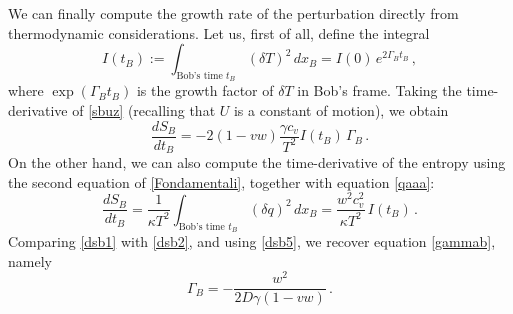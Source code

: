 \documentclass[a4paper, amsfonts, amssymb, amsmath, reprint, showkeys,  twoside, onecolumn,notitlepage,nofootinbib]{revtex4-1}
\theoremstyle{definition}
\theoremstyle{theorem}
\begin{document}
We can finally compute the growth rate of the perturbation directly from thermodynamic considerations. Let us, first of all, define the integral
\begin{equation}
I(t_B) := \int_{\text{Bob's time }t_B}  \! \! \! \!\! \! \! \! \! \! \! \! \!\! \! \! \! \! \! \! \! \!\!  (\delta T)^2 \, dx_B = I(0) \, e^{2\Gamma_B t_B} \, ,
\end{equation}
where $\exp(\Gamma_B t_B)$ is the growth factor of $\delta T$ in Bob's frame. Taking the time-derivative of \eqref{sbuz} (recalling that $U$ is a constant of motion), we obtain
\begin{equation}\label{dsb1}
\dfrac{dS_B}{dt_B} =  - 2(1-vw)\dfrac{\gamma c_v}{T^2} I(t_B) \,  \Gamma_B \, .
\end{equation}
On the other hand, we can also compute the time-derivative of the entropy using the second equation of \eqref{Fondamentali}, together with equation \eqref{qaaa}: 
\begin{equation}\label{dsb2}
\dfrac{dS_B}{dt_B} = \dfrac{1}{\kappa T^2} \int_{\text{Bob's time }t_B}  \! \! \! \!\! \! \! \! \! \! \! \! \!\! \! \! \! \! \! \! \! \!\!  (\delta q)^2 \, dx_B = \dfrac{w^2 c_v^2 }{\kappa T^2} \,  I(t_B) \, .
\end{equation}
Comparing \eqref{dsb1} with \eqref{dsb2}, and using \eqref{dsb5}, we recover equation \eqref{gammab}, namely
\begin{equation}
\Gamma_B = -\dfrac{w^2}{2D\gamma (1-vw)} \, .
\end{equation}












\label{lastpage}
\end{document}
